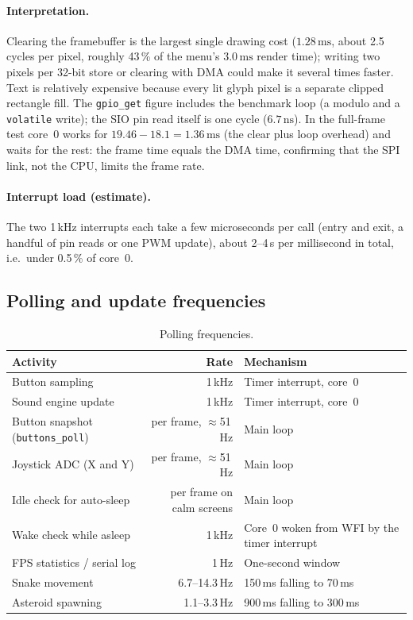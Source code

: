 \documentclass[11pt,a4paper]{article}
\newcommand{\unit}[2]{\ensuremath{#1\,\mathrm{#2}}}
\begin{document}
\paragraph{Interpretation.} Clearing the framebuffer is the largest single
drawing cost (\unit{1.28}{ms}, about 2.5 cycles per pixel, roughly 43\,\% of the
menu's \unit{3.0}{ms} render time); writing two pixels per 32-bit store or
clearing with DMA could make it several times faster. Text is relatively
expensive because every lit glyph pixel is a separate clipped rectangle fill.
The \texttt{gpio\_get} figure includes the benchmark loop (a modulo and a
\texttt{volatile} write); the SIO pin read itself is one cycle (\unit{6.7}{ns}).
In the full-frame test core~0 works for $19.46 - 18.1 = \unit{1.36}{ms}$ (the
clear plus loop overhead) and waits for the rest: the frame time equals the DMA
time, confirming that the SPI link, not the CPU, limits the frame rate.

\paragraph{Interrupt load (estimate).} The two 1\,kHz interrupts each take a few
microseconds per call (entry and exit, a handful of pin reads or one PWM update),
about 2--4\,\textmu s per millisecond in total, i.e.\ under 0.5\,\% of core~0.

\subsection{Polling and update frequencies}
\begin{table}[H]
\centering
\caption{Polling frequencies.}\label{tab:polling}
\begin{tabularx}{\linewidth}{lrX}
\toprule
\textbf{Activity} & \textbf{Rate} & \textbf{Mechanism} \\
\midrule
Button sampling & 1\,kHz & Timer interrupt, core~0 \\
Sound engine update & 1\,kHz & Timer interrupt, core~0 \\
Button snapshot (\texttt{buttons\_poll}) & per frame, $\approx$51\,Hz & Main loop \\
Joystick ADC (X and Y) & per frame, $\approx$51\,Hz & Main loop \\
Idle check for auto-sleep & per frame on calm screens & Main loop \\
Wake check while asleep & 1\,kHz & Core~0 woken from WFI by the timer interrupt \\
FPS statistics / serial log & 1\,Hz & One-second window \\
Snake movement & 6.7--14.3\,Hz & 150\,ms falling to 70\,ms \\
Asteroid spawning & 1.1--3.3\,Hz & 900\,ms falling to 300\,ms \\
\bottomrule
\end{tabularx}
\end{table}
\end{document}
